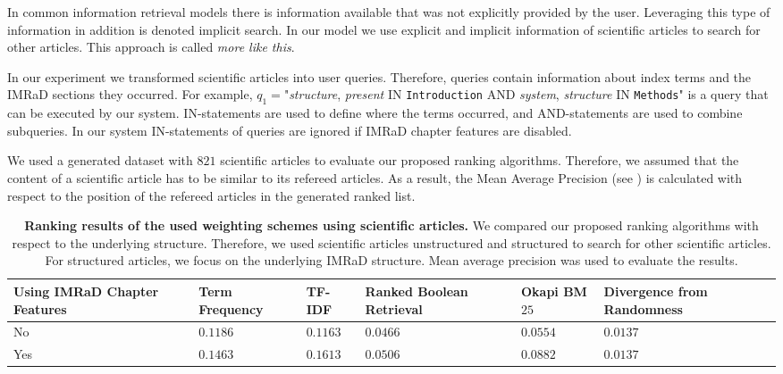 In common information retrieval models there is information available that was not explicitly provided by the user. Leveraging this type of information in addition is denoted implicit search. In our model we use explicit and implicit information of scientific articles to search for other articles. This approach is called \textit{more like this}.

In our experiment we transformed scientific articles into user queries. Therefore, queries contain information about index terms and the IMRaD sections they occurred. For example, $q_1=$"\textit{structure}, \textit{present} IN \texttt{Introduction} AND \textit{system}, \textit{structure} IN \texttt{Methods}" is a query that can be executed by our system. IN-statements are used to define where the terms occurred, and AND-statements are used to combine subqueries. In our system IN-statements of queries are ignored if IMRaD chapter features are disabled.

We used a generated dataset with $821$ scientific articles to evaluate our proposed ranking algorithms. Therefore, we assumed that the content of a scientific article has to be similar to its refereed articles. As a result, the Mean Average Precision (see ) is calculated with respect to the position of the refereed articles in the generated ranked list.

\begin{table}[b!]
    \centering
    \begin{tabular}{ C{2.1cm} C{2.1cm} C{2.1cm} C{2.1cm} C{2.1cm} C{2.1cm} }
      \toprule
      \textbf{Using IMRaD Chapter Features} & \textbf{Term Frequency} & \textbf{TF-IDF} & \textbf{Ranked Boolean Retrieval} & \textbf{Okapi BM$25$} & \textbf{Divergence from Randomness} \\ \midrule
      No  & $0.1186$ & $0.1163$ & $0.0466$ & $0.0554$ & $0.0137$ \\
      Yes & $0.1463$ & $0.1613$ & $0.0506$ & $0.0882$ & $0.0137$ \\
      \bottomrule
    \end{tabular}
  \caption[Ranking results using scientific articles]{\textbf{Ranking results of the used weighting schemes using scientific articles.} We compared our proposed ranking algorithms with respect to the underlying structure. Therefore, we used scientific articles unstructured and structured to search for other scientific articles. For structured articles, we focus on the underlying IMRaD structure. Mean average precision was used to evaluate the results.}
  \label{tbl:ranking_result_full}
\end{table}

